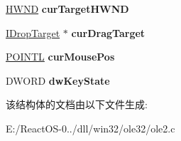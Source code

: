 \begin{DoxyCompactItemize}
\hyperlink{interfacevoid}{H\+W\+ND} {\bfseries cur\+Target\+H\+W\+ND}
\item 
\mbox{\label{structtag_tracker_window_info_a69eb26d226cab234f3479cd3d2493458}} 
\hyperlink{interface_i_drop_target}{I\+Drop\+Target} $\ast$ {\bfseries cur\+Drag\+Target}
\item 
\mbox{\label{structtag_tracker_window_info_a2fad39fa8ed89a24a87291e6d24652ae}} 
\hyperlink{struct___p_o_i_n_t_l}{P\+O\+I\+N\+TL} {\bfseries cur\+Mouse\+Pos}
\item 
\mbox{\label{structtag_tracker_window_info_a864b12f1c3503891f9c02f297769dea2}} 
D\+W\+O\+RD {\bfseries dw\+Key\+State}
\end{DoxyCompactItemize}


该结构体的文档由以下文件生成\+:\begin{DoxyCompactItemize}
\item 
E\+:/\+React\+O\+S-\/0../dll/win32/ole32/ole2.\+c\end{DoxyCompactItemize}
